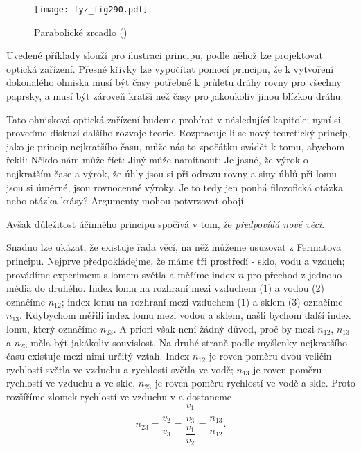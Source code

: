 {    \begin{figure}[ht!] %
      \centering
      \texttt{[image: fyz\_fig290.pdf]}
      \caption{Parabolické zrcadlo
               (\cite[s.~352]{Feynman01})}
      \label{fyz:fig290}
    \end{figure}

    Uvedené příklady slouží pro ilustraci principu, podle něhož lze projektovat optická zařízení. 
    Přesné křivky lze vypočítat pomocí principu, že k vytvoření dokonalého ohniska musí být časy 
    potřebné k průletu dráhy rovny pro všechny paprsky, a musí být zároveň kratší než časy pro 
    jakoukoliv jinou blízkou dráhu.
    
    Tato ohnisková optická zařízení budeme probírat v následující kapitole; nyní si proveďme 
    diskuzi dalšího rozvoje teorie. Rozpracuje-li se nový teoretický princip, jako je princip 
    nejkratšího času, může nás to zpočátku svádět k tomu, abychom řekli:  Někdo nám 
    může říct:  Jiný může namítnout:  Je jasné, že výrok o nejkratším čase a výrok, že 
    úhly jsou si při odrazu rovny a siny úhlů při lomu jsou si úměrné, jsou rovnocenné výroky. Je 
    to tedy jen pouhá filozofická otázka nebo otázka krásy? Argumenty mohou potvrzovat obojí. 
    
    Avšak důležitost účinného principu spočívá v tom, že \emph{předpovídá nové věci}. 
    
    Snadno lze ukázat, že existuje řada věcí, na něž můžeme usuzovat z Fermatova principu. Nejprve 
    předpokládejme, že máme tři prostředí - sklo, vodu a vzduch; provádíme experiment s lomem 
    světla a měříme index \(n\) pro přechod z jednoho média do druhého. Index lomu na rozhraní mezi 
    vzduchem (1) a vodou (2) označíme \(n_{12}\); index lomu na rozhraní mezi vzduchem (1) a sklem 
    (3) označíme \(n_{13}\). Kdybychom měřili index lomu mezi vodou a sklem, našli bychom další 
    index lomu, který označíme \(n_{23}\). A priori však není žádný důvod, proč by mezi \(n_{12}\), 
    \(n_{13}\) a \(n_{23}\) měla být jakákoliv souvislost. Na druhé straně podle myšlenky 
    nejkratšího času existuje mezi nimi určitý vztah. Index \(n_{12}\) je roven poměru dvou veličin 
    - rychlosti světla ve vzduchu a rychlosti světla ve vodě; \(n_{13}\) je roven poměru rychlostí 
    ve vzduchu a ve skle, \(n_{23}\) je roven poměru rychlostí ve vodě a skle. Proto rozšíříme 
    zlomek rychlostí ve vzduchu v a dostaneme
    \begin{equation}\label{fyz:eq357}
      n_{23} = \frac{v_2}{v_3} = \dfrac{\dfrac{v_1}{v_3}}{\dfrac{v_1}{v_2}} = \frac{n_{13}}{n_{12}}.
    \end{equation}
    
}
